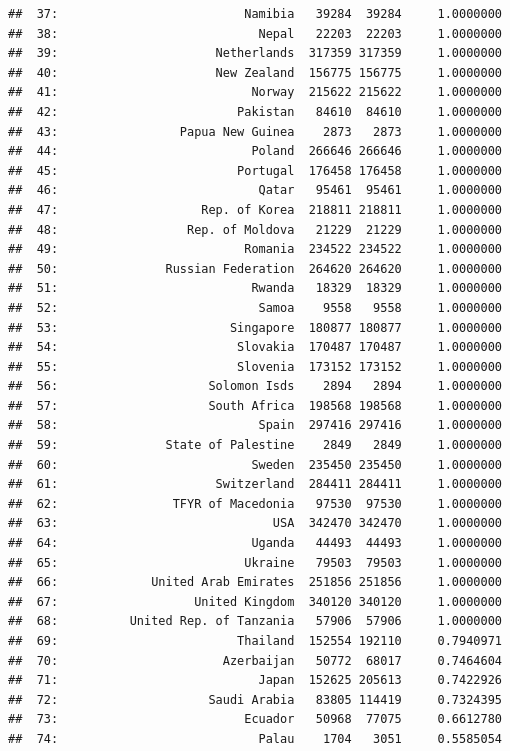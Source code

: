 \documentclass[10pt,]{article}
\begin{document}
\begin{verbatim}
##  37:                          Namibia   39284  39284     1.0000000
##  38:                            Nepal   22203  22203     1.0000000
##  39:                      Netherlands  317359 317359     1.0000000
##  40:                      New Zealand  156775 156775     1.0000000
##  41:                           Norway  215622 215622     1.0000000
##  42:                         Pakistan   84610  84610     1.0000000
##  43:                 Papua New Guinea    2873   2873     1.0000000
##  44:                           Poland  266646 266646     1.0000000
##  45:                         Portugal  176458 176458     1.0000000
##  46:                            Qatar   95461  95461     1.0000000
##  47:                    Rep. of Korea  218811 218811     1.0000000
##  48:                  Rep. of Moldova   21229  21229     1.0000000
##  49:                          Romania  234522 234522     1.0000000
##  50:               Russian Federation  264620 264620     1.0000000
##  51:                           Rwanda   18329  18329     1.0000000
##  52:                            Samoa    9558   9558     1.0000000
##  53:                        Singapore  180877 180877     1.0000000
##  54:                         Slovakia  170487 170487     1.0000000
##  55:                         Slovenia  173152 173152     1.0000000
##  56:                     Solomon Isds    2894   2894     1.0000000
##  57:                     South Africa  198568 198568     1.0000000
##  58:                            Spain  297416 297416     1.0000000
##  59:               State of Palestine    2849   2849     1.0000000
##  60:                           Sweden  235450 235450     1.0000000
##  61:                      Switzerland  284411 284411     1.0000000
##  62:                TFYR of Macedonia   97530  97530     1.0000000
##  63:                              USA  342470 342470     1.0000000
##  64:                           Uganda   44493  44493     1.0000000
##  65:                          Ukraine   79503  79503     1.0000000
##  66:             United Arab Emirates  251856 251856     1.0000000
##  67:                   United Kingdom  340120 340120     1.0000000
##  68:          United Rep. of Tanzania   57906  57906     1.0000000
##  69:                         Thailand  152554 192110     0.7940971
##  70:                       Azerbaijan   50772  68017     0.7464604
##  71:                            Japan  152625 205613     0.7422926
##  72:                     Saudi Arabia   83805 114419     0.7324395
##  73:                          Ecuador   50968  77075     0.6612780
##  74:                            Palau    1704   3051     0.5585054

\end{verbatim}
\end{document}
